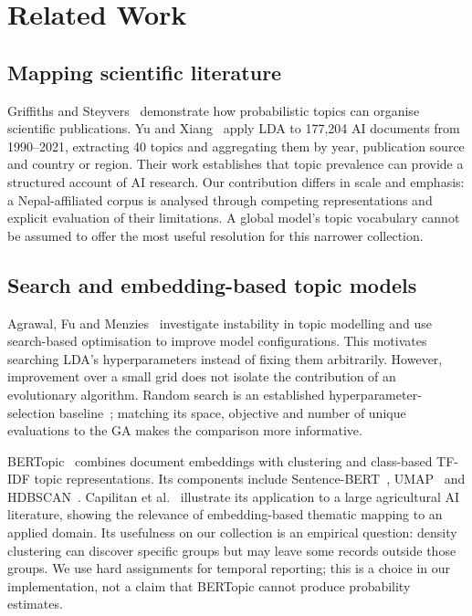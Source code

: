 \section{Related Work}
\label{sec:t1-related}

\subsection{Mapping scientific literature}
Griffiths and Steyvers~\cite{griffiths2004} demonstrate how probabilistic topics can organise
scientific publications. Yu and Xiang~\cite{yu2023} apply LDA to 177,204 AI documents from
1990--2021, extracting 40 topics and aggregating them by year, publication source and country or
region. Their work establishes that topic prevalence can provide a structured account of AI
research. Our contribution differs in scale and emphasis: a Nepal-affiliated corpus is analysed
through competing representations and explicit evaluation of their limitations. A global model's
topic vocabulary cannot be assumed to offer the most useful resolution for this narrower collection.

\subsection{Search and embedding-based topic models}
Agrawal, Fu and Menzies~\cite{agrawal2018} investigate instability in topic modelling and use
search-based optimisation to improve model configurations. This motivates searching LDA's
hyperparameters instead of fixing them arbitrarily. However, improvement over a small grid does
not isolate the contribution of an evolutionary algorithm. Random search is an established
hyperparameter-selection baseline~\cite{bergstra2012}; matching its space, objective and number
of unique evaluations to the GA makes the comparison more informative.

BERTopic~\cite{grootendorst2022} combines document embeddings with clustering and class-based
TF-IDF topic representations. Its components include Sentence-BERT~\cite{reimers2019},
UMAP~\cite{mcinnes2018} and HDBSCAN~\cite{campello2013}. Capilitan et al.~\cite{agri2026}
illustrate its application to a large agricultural AI literature, showing the relevance of
embedding-based thematic mapping to an applied domain. Its usefulness on our collection is an
empirical question: density clustering can discover specific groups but may leave some records
outside those groups. We use hard assignments for temporal reporting; this is a choice in our
implementation, not a claim that BERTopic cannot produce probability estimates.


